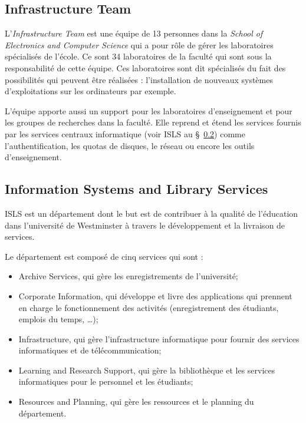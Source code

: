 \subsection{Infrastructure Team}

L'\textit{Infrastructure Team} est une \'equipe de 13 personnes dans la \textit{School of Electronics and Computer Science} qui a pour r\^ole de g\'erer les laboratoires sp\'ecialis\'es de l'\'ecole.
Ce sont 34 laboratoires de la facult\'e qui sont sous la responsabilit\'e de cette \'equipe.
Ces laboratoires sont dit sp\'ecialis\'es du fait des possibilit\'es qui peuvent \^etre r\'ealis\'ees : l'installation de nouveaux syst\`emes d'exploitations sur les ordinateurs par exemple.

L'\'equipe apporte aussi un support pour les laboratoires d'enseignement et pour les groupes de recherches dans la facult\'e.
Elle reprend et \'etend les services fournis par les services centraux informatique (voir ISLS au \S~\ref{section:ISLS}) comme l'authentification, les quotas de disques, le r\'eseau ou encore les outils d'enseignement.

\subsection{Information Systems and Library Services}
\label{section:ISLS}

ISLS est un d\'epartement dont le but est de contribuer \`a la qualit\'e de l'\'education dans l'universit\'e de Westminster \`a travers le d\'eveloppement et la livraison de services.

\noindent Le d\'epartement est compos\'e de cinq services qui sont :

\begin{itemize}
	\item Archive Services, qui g\`ere les enregistrements de l'universit\'e;
	\item Corporate Information, qui d\'eveloppe et livre des applications qui prennent en charge le fonctionnement des activit\'es (enregistrement des \'etudiants, emplois du temps, \ldots);
	\item Infrastructure, qui g\`ere l'infrastructure informatique pour fournir des services informatiques et de t\'el\'ecommunication;
	\item Learning and Research Support, qui g\`ere la biblioth\`eque et les services informatiques pour le personnel et les \'etudiants;
	\item Resources and Planning, qui g\`ere les ressources et le planning du d\'epartement.

\end{itemize}

